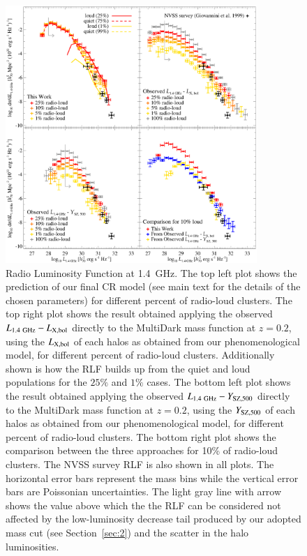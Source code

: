\documentclass[traditabstract]{aa}
\newcommand{\rmn}{\mathrm}
\begin{document}
\begin{figure}[t]
\centering
\includegraphics[width=0.85\textwidth]{figures/RLFs_1.4.eps}
\caption{Radio Luminosity Function at 1.4~GHz. The top left plot shows the prediction of our final CR model (see main text for the details of the chosen parameters) for different percent of radio-loud clusters. The top right plot shows the result obtained applying the observed $L_{1.4~\rmn{GHz}}-L_{\rm{X,bol}}$ directly to the MultiDark mass function at  $z = 0.2$, using the $L_{\rm{X,bol}}$ of each halos as obtained from our phenomenological model, for different percent of radio-loud clusters. Additionally shown is how the RLF builds up from the quiet and loud populations for the $25\%$ and $1\%$ cases. The bottom left plot shows the result obtained applying the observed $L_{1.4~\rmn{GHz}}-Y_{\rm{SZ}, 500}$ directly to the MultiDark mass function at  $z = 0.2$,  using the $Y_{\rm{SZ}, 500}$ of each halos as obtained from our phenomenological model, for different percent of radio-loud clusters. The bottom right plot shows the comparison between the three approaches for 10\% of radio-loud clusters. The NVSS survey RLF \citep{1999NewA....4..141G} is also shown in all plots. The horizontal error bars represent the mass bins while the vertical error bars are Poissonian uncertainties. The light gray line with arrow shows the value above which the the RLF can be considered not affected by the low-luminosity decrease tail produced by our adopted mass cut (see Section~\ref{sec:2}) and the scatter in the halo luminosities.}
\label{fig:RLF_1.4}
\end{figure}
\end{document}
